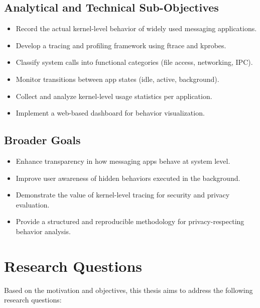 \documentclass[a4paper,12pt]{report}
\begin{document}
\subsection*{Analytical and Technical Sub-Objectives}
\begin{itemize}
\item Record the actual kernel-level behavior of widely used messaging applications.
\item Develop a tracing and profiling framework using ftrace and kprobes.
\item Classify system calls into functional categories (file access, networking, IPC).
\item Monitor transitions between app states (idle, active, background).
\item Collect and analyze kernel-level usage statistics per application.
\item Implement a web-based dashboard for behavior visualization.
\end{itemize}

\subsection*{Broader Goals}
\begin{itemize}
\item Enhance transparency in how messaging apps behave at system level.
\item Improve user awareness of hidden behaviors executed in the background.
\item Demonstrate the value of kernel-level tracing for security and privacy evaluation.
\item Provide a structured and reproducible methodology for privacy-respecting behavior analysis.
\end{itemize}

\section{Research Questions}
Based on the motivation and objectives, this thesis aims to address the following research questions:

\vspace{0.5em}
\noindent{}

\vspace{0.5em}
\noindent{}
\end{document}
